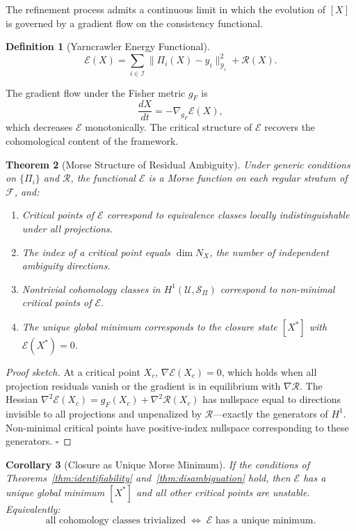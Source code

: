 \documentclass[11pt, oneside]{article}
\newtheorem{theorem}{Theorem}[section]
\newtheorem{corollary}[theorem]{Corollary}
\newtheorem{definition}[theorem]{Definition}
\begin{document}
The refinement process admits a continuous limit in which the evolution of $[X]$ is
governed by a gradient flow on the consistency functional.

\begin{definition}[Yarncrawler Energy Functional]
\[
\mathcal{E}(X) = \sum_{i \in \mathcal{I}} \|\Pi_i(X) - y_i\|_{\mathcal{Y}_i}^2
+ \mathcal{R}(X).
\]
\end{definition}

The gradient flow under the Fisher metric $g_F$ is
\[
\frac{dX}{dt} = -\nabla_{g_F} \mathcal{E}(X),
\]
which decreases $\mathcal{E}$ monotonically. The critical structure of $\mathcal{E}$
recovers the cohomological content of the framework.

\begin{theorem}[Morse Structure of Residual Ambiguity]
\label{thm:morse}
Under generic conditions on $\{\Pi_i\}$ and $\mathcal{R}$, the functional $\mathcal{E}$
is a Morse function on each regular stratum of $\mathcal{F}$, and:
\begin{enumerate}
\item[(i)] Critical points of $\mathcal{E}$ correspond to equivalence classes locally
indistinguishable under all projections.
\item[(ii)] The index of a critical point equals $\dim N_X$, the number of independent
ambiguity directions.
\item[(iii)] Nontrivial cohomology classes in $H^1(\mathcal{U}, \mathcal{S}_\Pi)$
correspond to non-minimal critical points of $\mathcal{E}$.
\item[(iv)] The unique global minimum corresponds to the closure state $[X^*]$ with
$\mathcal{E}(X^*) = 0$.
\end{enumerate}
\end{theorem}

\begin{proof}[Proof sketch]
At a critical point $X_c$, $\nabla\mathcal{E}(X_c) = 0$, which holds when all projection
residuals vanish or the gradient is in equilibrium with $\nabla\mathcal{R}$. The Hessian
$\nabla^2\mathcal{E}(X_c) = g_F(X_c) + \nabla^2\mathcal{R}(X_c)$ has nullspace equal to
directions invisible to all projections and unpenalized by $\mathcal{R}$---exactly
the generators of $H^1$. Non-minimal critical points have positive-index nullspace
corresponding to these generators. $\square$
\end{proof}

\begin{corollary}[Closure as Unique Morse Minimum]
If the conditions of Theorems~\ref{thm:identifiability} and~\ref{thm:disambiguation}
hold, then $\mathcal{E}$ has a unique global minimum $[X^*]$ and all other critical points
are unstable. Equivalently:
\[
\text{all cohomology classes trivialized}
\;\Longleftrightarrow\;
\mathcal{E} \text{ has a unique minimum}.
\]
\end{corollary}
\end{document}
